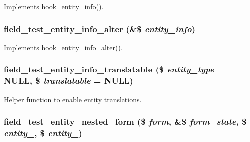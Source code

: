 \label{field__test_8entity_8inc_a51bbbb4d2a09faac17afe13915e29225}
Implements \hyperlink{group__hooks_gaf02318e9d0e8cdbf6d187b271b9969a8}{hook\_\-entity\_\-info()}. \hypertarget{field__test_8entity_8inc_a67703b2e4cd5f075eb297ffe91a23529}{
\subsubsection[{field\_\-test\_\-entity\_\-info\_\-alter}]{\setlength{\rightskip}{0pt plus 5cm}field\_\-test\_\-entity\_\-info\_\-alter (\&\$ {\em entity\_\-info})}}
\label{field__test_8entity_8inc_a67703b2e4cd5f075eb297ffe91a23529}
Implements \hyperlink{group__hooks_ga0394a72e4872603e91ce22440195ab45}{hook\_\-entity\_\-info\_\-alter()}. \hypertarget{field__test_8entity_8inc_aa6b63bbc32987ee1c530fcdbfa61a193}{
\subsubsection[{field\_\-test\_\-entity\_\-info\_\-translatable}]{\setlength{\rightskip}{0pt plus 5cm}field\_\-test\_\-entity\_\-info\_\-translatable (\$ {\em entity\_\-type} = {\ttfamily NULL}, \/  \$ {\em translatable} = {\ttfamily NULL})}}
\label{field__test_8entity_8inc_aa6b63bbc32987ee1c530fcdbfa61a193}
Helper function to enable entity translations. \hypertarget{field__test_8entity_8inc_a8161d4c3065234379c6d6379ad71afbd}{
\subsubsection[{field\_\-test\_\-entity\_\-nested\_\-form}]{\setlength{\rightskip}{0pt plus 5cm}field\_\-test\_\-entity\_\-nested\_\-form (\$ {\em form}, \/  \&\$ {\em form\_\-state}, \/  \$ {\em entity\_}, \/  \$ {\em entity\_})}}
